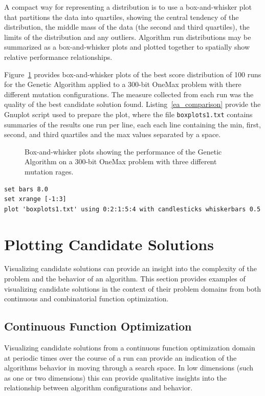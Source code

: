 \documentclass[a4paper, 11pt]{article}
\begin{document}
A compact way for representing a distribution is to use a box-and-whisker plot that partitions the data into quartiles, showing the central tendency of the distribution, the middle mass of the data (the second and third quartiles), the limits of the distribution and any outliers. Algorithm run distributions may be summarized as a box-and-whisker plots and plotted together to spatially show relative performance relationships.

Figure~\ref{plot:ga3} provides box-and-whisker plots of the best score distribution of 100 runs for the Genetic Algorithm applied to a 300-bit OneMax problem with there different mutation configurations. The measure collected from each run was the quality of the best candidate solution found. 
Listing~\ref{ea_comparison} provide the Gnuplot script used to prepare the plot, where the file \texttt{boxplots1.txt} contains summaries of the results one run per line, each each line containing the min, first, second, and third quartiles and the max values separated by a space.

\begin{figure}[htp]
\centering

\caption{Box-and-whisker plots showing the performance of the Genetic Algorithm on a 300-bit OneMax problem with three different mutation rages.}
\label{plot:ga3}
\end{figure}

\begin{lstlisting}[caption=Gnuplot script for creating a boxplot., label=ea_comparison]
set bars 8.0
set xrange [-1:3]
plot 'boxplots1.txt' using 0:2:1:5:4 with candlesticks whiskerbars 0.5
\end{lstlisting}

%
%
\section{Plotting Candidate Solutions}
Visualizing candidate solutions can provide an insight into the complexity of the problem and the behavior of an algorithm.  This section provides examples of visualizing candidate solutions in the context of their problem domains from both continuous and combinatorial function optimization.

\subsection{Continuous Function Optimization}
Visualizing candidate solutions from a continuous function optimization domain at periodic times over the course of a run can provide an indication of the algorithms behavior in moving through a search space. In low dimensions (such as one or two dimensions) this can provide qualitative insights into the relationship between algorithm configurations and behavior.
\end{document}
